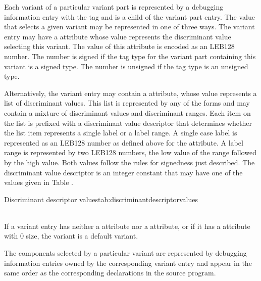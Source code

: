 Each variant of a particular variant part is represented
by\hypertarget{chap:DWATdiscrvaluediscriminantvalue}{}
a debugging information entry with the
tag \DWTAGvariantTARG{}
and is a child of the variant part entry. The value that
selects a given variant may be represented in one of three
ways. The variant entry may have a \DWATdiscrvalueDEFN{}
attribute
whose value represents the discriminant value selecting
this variant. The value of this
attribute is encoded as an LEB128 number. The number is signed
if the tag type for the variant part containing this variant
is a signed type. The number is unsigned if the tag type is
an unsigned type.

Alternatively,\hypertarget{chap:DWATdiscrlistlistofdiscriminantvalues}{}
the variant entry may contain a
\DWATdiscrlistDEFN{}
attribute, whose value represents a list of discriminant
values. This list is represented by any of the
 forms and may contain a
mixture of discriminant values and discriminant ranges.
Each item on the list is prefixed with a discriminant value
descriptor that determines whether the list item represents
a single label or a label range. A single case label is
represented as an LEB128 number as defined above for the
\DWATdiscrvalue{}
attribute. A label range is represented by
two LEB128 numbers, the low value of the range followed by the
high value. Both values follow the rules for signedness just
described. The discriminant value descriptor is an integer
constant that may have one of the values given in
Table .

\begin{simplenametable}[1.4in]{Discriminant descriptor values}{tab:discriminantdescriptorvalues}
\DWDSClabelTARG{} \\
\DWDSCrangeTARG{} \\
\end{simplenametable}

If a variant entry has neither a \DWATdiscrvalue{}
attribute nor a \DWATdiscrlist{} attribute, or if it has
a \DWATdiscrlist{} attribute with 0 size, the variant is a
default variant.

The components selected by a particular variant are represented
by debugging information entries owned by the corresponding
variant entry and appear in the same order as the corresponding
declarations in the source program.

